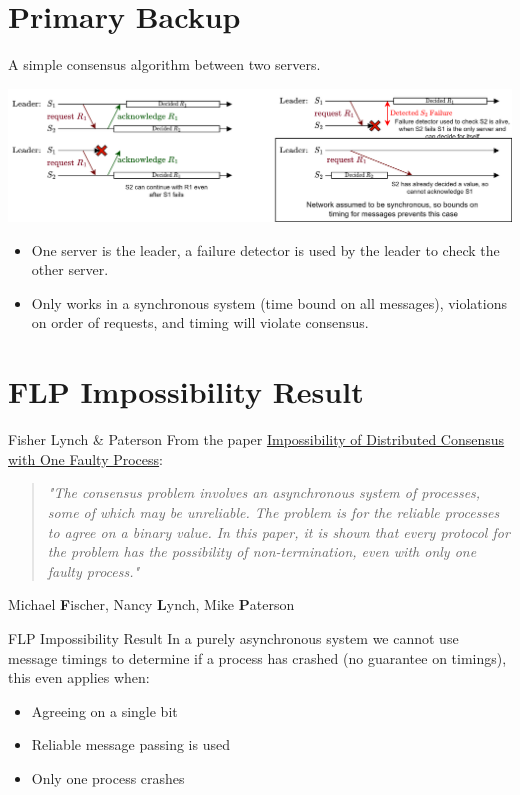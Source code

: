 \section{Primary Backup}
A simple consensus algorithm between two servers.
\begin{center}
    \includegraphics[width=.9\textwidth]{consensus/images/primary_backup_scenarios.drawio.png}
\end{center}
\begin{itemize}
    \item One server is the leader, a failure detector is used by the leader to check the other server.
    \item Only works in a synchronous system (time bound on all messages), violations on order of requests, and timing will violate consensus.
\end{itemize}

\section{FLP Impossibility Result}
\begin{sidenotebox}{Fisher Lynch \& Paterson}
    From the paper \href{https://groups.csail.mit.edu/tds/papers/Lynch/jacm85.pdf}{Impossibility of Distributed Consensus with One Faulty Process}:
    \begin{quote}
        \textit{"The consensus problem involves an asynchronous system of processes, 
        some of which may be unreliable. The problem is for the reliable
        processes to agree on a binary value. In this paper, it is shown that 
        every protocol for the problem has the possibility of non-termination, 
        even with only one faulty process."}
    \end{quote}
    Michael \textbf{F}ischer, Nancy \textbf{L}ynch, Mike \textbf{P}aterson
\end{sidenotebox}

\begin{definitionbox}{FLP Impossibility Result}
    In a purely asynchronous system we cannot use message timings to determine if a process has crashed (no guarantee on timings), this even applies when:
    \begin{itemize}
        \item Agreeing on a single bit
        \item Reliable message passing is used
        \item Only one process crashes
    \end{itemize}
\end{definitionbox}

